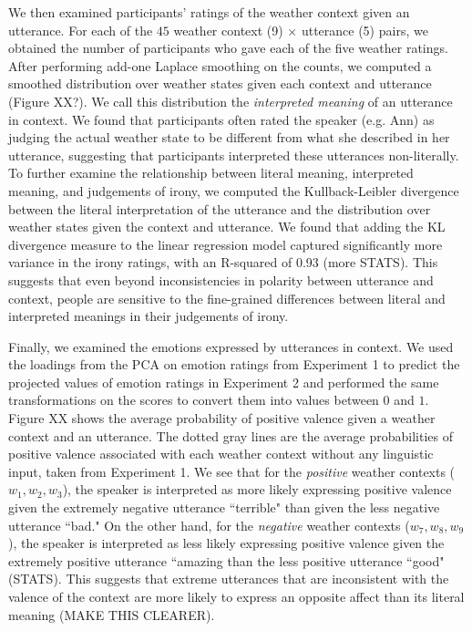 \documentclass[10pt,letterpaper]{article}
\begin{document}
We then examined participants' ratings of the weather context given an utterance. For each of the $45$ weather context (9) $\times$ utterance (5) pairs, we obtained the number of participants who gave each of the five weather ratings. After performing add-one Laplace smoothing on the counts, we computed a smoothed distribution over weather states given each context and utterance (Figure XX?). We call this distribution the \emph{interpreted meaning} of an utterance in context. We found that participants often rated the speaker (e.g. Ann) as judging the actual weather state to be different from what she described in her utterance, suggesting that participants interpreted these utterances non-literally. To further examine the relationship between literal meaning, interpreted meaning, and judgements of irony, we computed the Kullback-Leibler divergence between the literal interpretation of the utterance and the distribution over weather states given the context and utterance. We found that adding the KL divergence measure to the linear regression model captured significantly more variance in the irony ratings, with an R-squared of 0.93 (more STATS). This suggests that even beyond inconsistencies in polarity between utterance and context, people are sensitive to the fine-grained differences between literal and interpreted meanings in their judgements of irony.

Finally, we examined the emotions expressed by utterances in context. We used the loadings from the PCA on emotion ratings from Experiment 1 to predict the projected values of emotion ratings in Experiment 2 and performed the same transformations on the scores to convert them into values between $0$ and $1$. Figure XX shows the average probability of positive valence given a weather context and an utterance. The dotted gray lines are the average probabilities of positive valence associated with each weather context without any linguistic input, taken from Experiment 1. We see that for the \emph{positive} weather contexts ($w_1, w_2, w_3$), the speaker is interpreted as more likely expressing positive valence given the extremely negative utterance ``terrible" than given the less negative utterance ``bad." On the other hand, for the \emph{negative} weather contexts ($w_7, w_8, w_9$), the speaker is interpreted as less likely expressing positive valence given the extremely positive utterance ``amazing than the less positive utterance ``good" (STATS). This suggests that extreme utterances that are inconsistent with the valence of the context are more likely to express an opposite affect than its literal meaning (MAKE THIS CLEARER).
\end{document}
